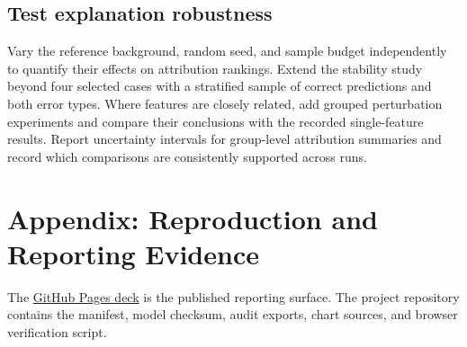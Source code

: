 \documentclass[12pt,oneside]{report}
\begin{document}
\section{Test explanation robustness}
Vary the reference background, random seed, and sample budget independently to quantify their effects on attribution rankings. Extend the stability study beyond four selected cases with a stratified sample of correct predictions and both error types. Where features are closely related, add grouped perturbation experiments and compare their conclusions with the recorded single-feature results. Report uncertainty intervals for group-level attribution summaries and record which comparisons are consistently supported across runs.

\chapter*{Appendix: Reproduction and Reporting Evidence}
The \href{https://aditya-ranjan1234.github.io/Interpretml-AI-Text-Detector/}{GitHub Pages deck} is the published reporting surface. The project repository contains the manifest, model checksum, audit exports, chart sources, and browser verification script.

\end{document}
